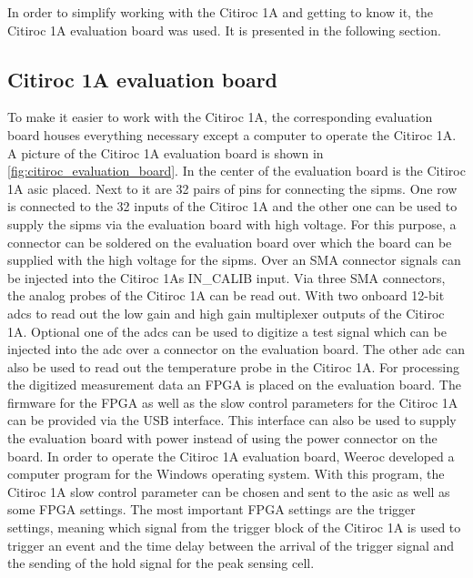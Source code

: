 In order to simplify working with the Citiroc 1A and getting to know it, the Citiroc 1A evaluation board was used.
It is presented in the following section.








\subsection{Citiroc 1A evaluation board}

To make it easier to work with the Citiroc 1A, the corresponding evaluation board houses everything necessary except a computer to operate the Citiroc 1A.
A picture of the Citiroc 1A evaluation board is shown in \autoref{fig:citiroc_evaluation_board}.
In the center of the evaluation board is the Citiroc 1A \ac{asic} placed.
Next to it are 32 pairs of pins for connecting the \ac{sipm}s.
One row is connected to the 32 inputs of the Citiroc 1A and the other one can be used to supply the \ac{sipm}s via the evaluation board with high voltage.
For this purpose, a connector can be soldered on the evaluation board over which the board can be supplied with the high voltage for the \ac{sipm}s.
Over an SMA connector signals can be injected into the Citiroc 1As IN\_CALIB input.
Via three SMA connectors, the analog probes of the Citiroc 1A can be read out.
With two onboard 12-bit \ac{adc}s to read out the low gain and high gain multiplexer outputs of the Citiroc 1A.
Optional one of the \ac{adc}s can be used to digitize a test signal which can be injected into the \ac{adc} over a connector on the evaluation board.
The other \ac{adc} can also be used to read out the temperature probe in the Citiroc 1A.
For processing the digitized measurement data an FPGA is placed on the evaluation board.
The firmware for the FPGA as well as the slow control parameters for the Citiroc 1A can be provided via the USB interface.
This interface can also be used to supply the evaluation board with power instead of using the power connector on the board.
In order to operate the Citiroc 1A evaluation board, Weeroc developed a computer program for the Windows operating system.
With this program, the Citiroc 1A slow control parameter can be chosen and sent to the \ac{asic} as well as some FPGA settings.
The most important FPGA settings are the trigger settings, meaning which signal from the trigger block of the Citiroc 1A is used to trigger an event and the time delay between the arrival of the trigger signal and the sending of the hold signal for the peak sensing cell.

